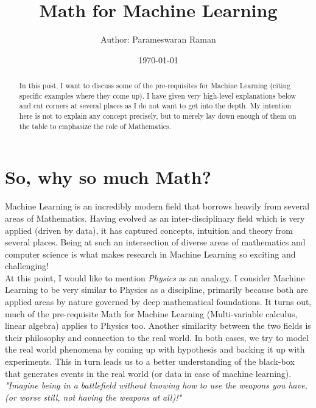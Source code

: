 \documentclass[a4paper]{article}
\title{Math for Machine Learning}
\author{Author: Parameswaran Raman}
\date{\today}
\begin{document}

\maketitle

\begin{abstract}
\noindent In this post, I want to discuss some of the pre-requisites for Machine Learning (citing specific examples where they come up). I have given very high-level explanations below and cut corners at several places as I do not want to get into the depth. My intention here is not to explain any concept precisely, but to merely lay down enough of them on the table to emphasize the role of Mathematics.
\end{abstract}

\section{So, why so much Math?}

\noindent Machine Learning is an incredibly modern field that borrows heavily from several areas of Mathematics. Having evolved as an inter-disciplinary field which is very applied (driven by data), it has captured concepts, intuition and theory from several places. Being at such an intersection of diverse areas of mathematics and computer science is what makes research in Machine Learning so exciting and challenging! \\

\noindent At this point, I would like to mention {\it Physics} as an analogy. I consider Machine Learning to be very similar to Physics as a discipline, primarily because both are applied areas by nature governed by deep mathematical foundations. It turns out, much of the pre-requisite Math for Machine Learning (Multi-variable calculus, linear algebra) applies to Physics too. Another similarity between the two fields is their philosophy and connection to the real world. In both cases, we try to model the real world phenomena by coming up with hypothesis and backing it up with experiments. This in turn leads us to a better understanding of the black-box that generates events in the real world (or data in case of machine learning). \\

\noindent \textit{"Imagine being in a battlefield without knowing how to use the weapons you have, (or worse still, not having the weapons at all)!"} \\
\end{document}
